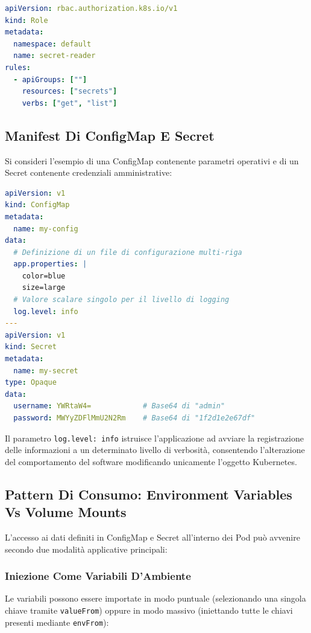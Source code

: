 \documentclass[11pt, a4paper]{article}
\begin{document}
\begin{lstlisting}[language=yaml]
apiVersion: rbac.authorization.k8s.io/v1
kind: Role
metadata:
  namespace: default
  name: secret-reader
rules:
  - apiGroups: [""]
    resources: ["secrets"]
    verbs: ["get", "list"]
\end{lstlisting}

\subsection{Manifest Di ConfigMap E Secret}

Si consideri l'esempio di una ConfigMap contenente parametri operativi e di un Secret contenente credenziali amministrative:

\begin{lstlisting}[language=yaml]
apiVersion: v1
kind: ConfigMap
metadata:
  name: my-config
data:
  # Definizione di un file di configurazione multi-riga
  app.properties: |
    color=blue
    size=large
  # Valore scalare singolo per il livello di logging
  log.level: info
---
apiVersion: v1
kind: Secret
metadata:
  name: my-secret
type: Opaque
data:
  username: YWRtaW4=            # Base64 di "admin"
  password: MWYyZDFlMmU2N2Rm    # Base64 di "1f2d1e2e67df"
\end{lstlisting}

Il parametro \texttt{log.level: info} istruisce l'applicazione ad avviare la registrazione delle informazioni a un determinato livello di verbosità, consentendo l'alterazione del comportamento del software modificando unicamente l'oggetto Kubernetes.

\subsection{Pattern Di Consumo: Environment Variables Vs Volume Mounts}

L'accesso ai dati definiti in ConfigMap e Secret all'interno dei Pod può avvenire secondo due modalità applicative principali:

\subsubsection{Iniezione Come Variabili D'Ambiente}
Le variabili possono essere importate in modo puntuale (selezionando una singola chiave tramite \texttt{valueFrom}) oppure in modo massivo (iniettando tutte le chiavi presenti mediante \texttt{envFrom}):
\end{document}

